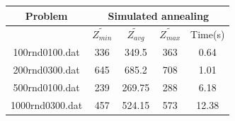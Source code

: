 \documentclass[12pt]{article}
\begin{document}
	\begin{center}
			\begin{tabular}{|c|c|c|c|c|}
				\hline
				Problem &\multicolumn{4}{|c|}{Simulated annealing} \\
				\hline
				& $\tilde{Z_{min }}$ & $\tilde{Z_{avg}}$ & $\tilde{Z_{max}}$&Time(s) \\ 
				\hline
				100rnd0100.dat & 336 & 349.5 & 363 & 0.64  \\
				\hline
				200rnd0300.dat& 645 & 685.2 & 708  & 1.01  \\
				\hline
				500rnd0100.dat& 239 & 269.75 & 288  & 6.18 \\
				\hline
				1000rnd0300.dat& 457 & 524.15 & 573 &  12.38 \\
				\hline
			\end{tabular}
	\end{center}
\end{document}
